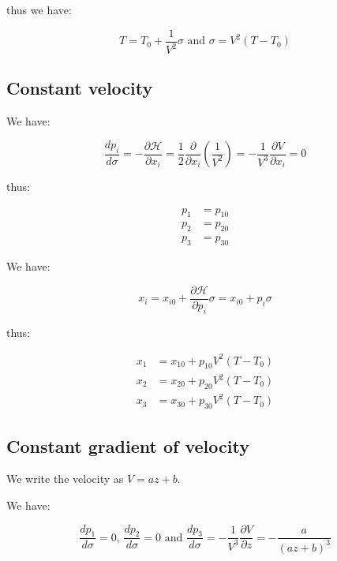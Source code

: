 \documentclass[main.tex]{subfiles}
\begin{document}
thus we have:

\begin{equation}
T = T_0 + \frac{1}{V^2} \sigma \text{ and } \sigma = V^2 (T - T_0)
\end{equation}

\subsection{Constant velocity}

We have:

\begin{equation}
\frac{dp_i}{d\sigma} = - \frac{\partial \mathcal H}{\partial x_i} = \frac{1}{2} \frac{\partial}{\partial x_i} (\frac{1}{V^2}) = - \frac{1}{V^3} \frac{\partial V}{\partial x_i} = 0
\end{equation}

thus:

\begin{equation}
\begin{split}
p_1 & = p_{10} \\
p_2 & = p_{20} \\
p_3 & = p_{30}
\end{split}
\end{equation}

We have:

\begin{equation}
x_i = x_{i0} + \frac{\partial \mathcal H}{\partial p_i} \sigma = x_{i0} + p_i \sigma
\end{equation}

thus:

\begin{equation}
\begin{split}
x_1 & = x_{10} + p_{10} V^2 (T - T_0) \\
x_2 & = x_{20} + p_{20} V^2 (T - T_0) \\
x_3 & = x_{30} + p_{30} V^2 (T - T_0)
\end{split}
\end{equation}

\subsection{Constant gradient of velocity}

We write the velocity as $V = a z + b$.

We have:

\begin{equation}
\frac{dp_1}{d\sigma} = 0 \text{, } \frac{dp_2}{d\sigma} = 0 \text{ and } \frac{dp_3}{d\sigma} = - \frac{1}{V^3} \frac{\partial V}{\partial z} = - \frac{a}{(a z + b)^3}
\end{equation}
\end{document}
